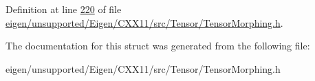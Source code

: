 Definition at line \hyperlink{eigen_2unsupported_2_eigen_2_c_x_x11_2src_2_tensor_2_tensor_morphing_8h_source_l00220}{220} of file \hyperlink{eigen_2unsupported_2_eigen_2_c_x_x11_2src_2_tensor_2_tensor_morphing_8h_source}{eigen/unsupported/\+Eigen/\+C\+X\+X11/src/\+Tensor/\+Tensor\+Morphing.\+h}.



The documentation for this struct was generated from the following file\+:\begin{DoxyCompactItemize}
\item 
eigen/unsupported/\+Eigen/\+C\+X\+X11/src/\+Tensor/\+Tensor\+Morphing.\+h\end{DoxyCompactItemize}

